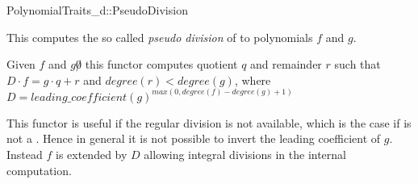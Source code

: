 \begin{ccRefConcept}{PolynomialTraits_d::PseudoDivision}

\ccDefinition

This  computes the so called {\em pseudo division} 
of to polynomials $f$ and $g$. 
     
Given $f$ and $g \not 0$ this functor computes quotient $q$ and
remainder $r$ such that $D \cdot f = g \cdot q + r$ and $degree(r) < degree(g)$,
where $ D = leading\_coefficient(g)^{max(0, degree(f)-degree(g)+1)}$

This functor is useful if the regular division is not available, 
which is the case if  is not a . 
Hence in general it is not possible to invert the leading coefficient of $g$. 
Instead $f$ is extended by $D$ allowing integral divisions in the internal 
computation. 


\ccRefines 
{}

\ccTypes


\ccGlue

\ccOperations



\ccSeeAlso

\\
\\
\\
\\
\\

\end{ccRefConcept}